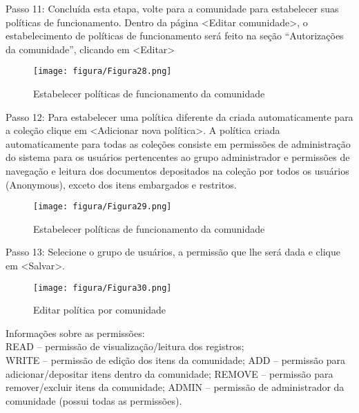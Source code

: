\documentclass[12pt,hidelinks]{article}
\begin{document}
    Passo 11: Concluída esta etapa, volte para a comunidade para estabelecer suas políticas de funcionamento. Dentro da página <Editar comunidade>, o estabelecimento de políticas de funcionamento será feito na seção “Autorizações da comunidade”, clicando em <Editar>
    
    \begin{figure}[!htp]
                \centering
                \texttt{[image: figura/Figura28.png]}
                \caption{Estabelecer políticas de funcionamento da comunidade}
            \label{Rotulo}
        \end{figure}
        
\newpage
        
    Passo 12: Para estabelecer uma política diferente da criada automaticamente para a coleção clique em <Adicionar nova política>.
    \singlespacing
    A política criada automaticamente para todas as coleções consiste em permissões de administração do sistema para os usuários pertencentes ao grupo administrador e permissões de navegação e leitura dos documentos depositados na coleção por todos os usuários (Anonymous), exceto dos itens embargados e restritos.
    
    \begin{figure}[!htp]
                \centering
                \texttt{[image: figura/Figura29.png]}
                \caption{Estabelecer políticas de funcionamento da comunidade}
            \label{Rotulo}
        \end{figure}
    
    Passo 13: Selecione o grupo de usuários, a permissão que lhe será dada e clique em <Salvar>.
    
    \begin{figure}[!htp]
                \centering
                \texttt{[image: figura/Figura30.png]}
                \caption{Editar política por comunidade}
            \label{Rotulo}
        \end{figure}

\newpage
    Informações sobre as permissões:\\
    READ – permissão de visualização/leitura dos registros; \\
    WRITE – permissão de edição dos itens da comunidade;
    ADD – permissão para adicionar/depositar itens dentro da comunidade;
    REMOVE – permissão para remover/excluir itens da comunidade;
    ADMIN – permissão de administrador da comunidade (possui todas as permissões).
    
\end{document}
